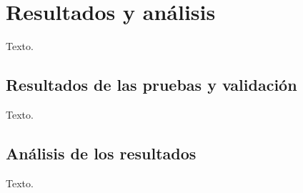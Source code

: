 \chapter{Resultados y análisis}
Texto.

\section{Resultados de las pruebas y validación}
Texto.

\section{Análisis de los resultados}
Texto.
